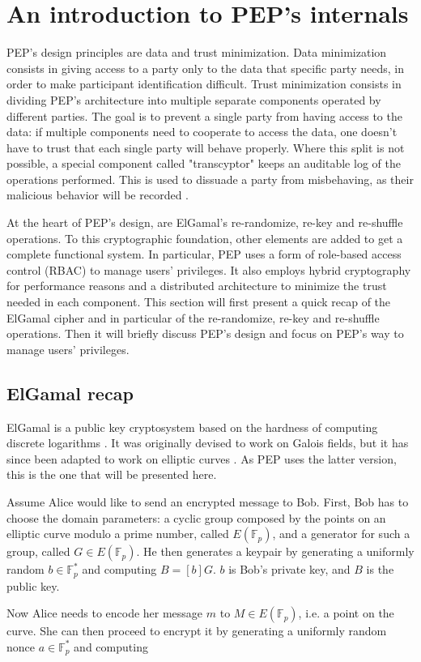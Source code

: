 \documentclass{report}
\begin{document}
\section{An introduction to PEP's internals}
PEP's design principles are data and trust minimization. Data minimization consists in giving access to a party only to the data that specific party needs, in order to make
participant identification difficult. Trust minimization consists in dividing PEP's architecture into multiple separate components operated by different parties. The goal is to
prevent a single party from having access to the data: if multiple components need to cooperate to access the data, one doesn't have to trust that each single party will
behave properly. Where this split is not possible, a special component called "transcyptor" keeps an auditable log of the operations performed. This is used to dissuade a party
from misbehaving, as their malicious behavior will be recorded \cite{pep-blueprint}. \par
At the heart of PEP's design, are ElGamal's re-randomize, re-key and re-shuffle operations. To this cryptographic foundation, other elements are added to get a complete functional system. In
particular, PEP uses a form of role-based access control (RBAC) \cite{rbac} to manage users' privileges. It also employs hybrid cryptography for performance reasons and a
distributed architecture to minimize the trust needed in each component. This section will first present a quick recap of the ElGamal cipher and in particular of the re-randomize, re-key and re-shuffle
operations. Then it will briefly discuss PEP's design and focus on PEP's way to manage users' privileges.

\subsection{ElGamal recap}
ElGamal is a public key cryptosystem based on the hardness of computing discrete logarithms \cite{elgamal}. It was originally devised to work on Galois fields, but it has since
been adapted to work on elliptic curves \cite{elliptic-elgamal}. As PEP uses the latter version, this is the one that will be presented here.\par
Assume Alice would like to send an encrypted message to Bob. First, Bob has to choose the domain parameters: a cyclic group composed by the points on an elliptic curve modulo a
prime number, called $E(\mathds{F}_p)$, and a generator for such a group, called $G \in E(\mathds{F}_p)$. He then generates a keypair by generating a uniformly random $b \in \mathds{F}^*_p$ and computing
$B=[b]G$. $b$ is Bob's private key, and $B$ is the public key.\par
Now Alice needs to encode her message $m$ to $M \in E(\mathds{F}_p)$, i.e. a point on the curve. She can then proceed to encrypt it by generating a uniformly random nonce $a \in
\mathds{F}^*_p$ and computing
\end{document}
